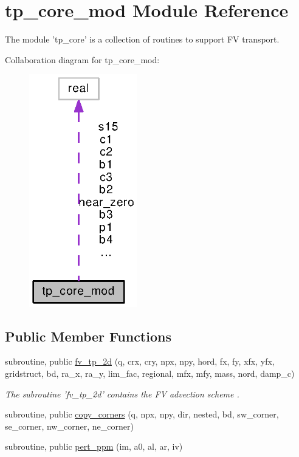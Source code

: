 \section{tp\-\_\-core\-\_\-mod Module Reference}
\label{classtp__core__mod}


The module 'tp\-\_\-core' is a collection of routines to support F\-V transport.  




Collaboration diagram for tp\-\_\-core\-\_\-mod\-:
\nopagebreak
\begin{figure}[H]
\begin{center}
\leavevmode
\includegraphics[width=133pt]{classtp__core__mod__coll__graph}
\end{center}
\end{figure}
\subsection*{Public Member Functions}
\begin{DoxyCompactItemize}
\item 
subroutine, public \hyperlink{classtp__core__mod_a9f509ba0cc0327529ea3178fccc590b2}{fv\-\_\-tp\-\_\-2d} (q, crx, cry, npx, npy, hord, fx, fy, xfx, yfx, gridstruct, bd, ra\-\_\-x, ra\-\_\-y, lim\-\_\-fac, regional, mfx, mfy, mass, nord, damp\-\_\-c)
\begin{DoxyCompactList}\small\item\em The subroutine 'fv\-\_\-tp\-\_\-2d' contains the F\-V advection scheme \cite{putman2007finite} \cite{lin1996multiflux}. \end{DoxyCompactList}\item 
subroutine, public \hyperlink{classtp__core__mod_aaa4f5a41e80dd1b45bd71a420e943b69}{copy\-\_\-corners} (q, npx, npy, dir, nested, bd, sw\-\_\-corner, se\-\_\-corner, nw\-\_\-corner, ne\-\_\-corner)
\item 
subroutine, public \hyperlink{classtp__core__mod_a9767d0f0c59231cb9896304f8882b2d9}{pert\-\_\-ppm} (im, a0, al, ar, iv)
\end{DoxyCompactItemize}
